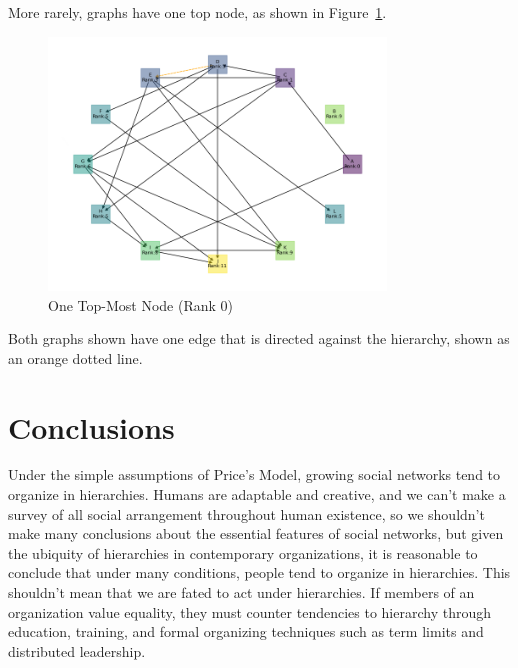 \documentclass[12pt]{article}
\begin{document}
More rarely, graphs have one top node, as shown in Figure~\ref{fig:one-top-node}.
\begin{figure}[H]
    \centering
    \includegraphics[width=0.8\textwidth]{images/2025-06-01-15:51:36.967731-network.png}
    \caption{One Top-Most Node (Rank 0)}
    \label{fig:one-top-node}
\end{figure}

Both graphs shown have one edge that is directed against the hierarchy, shown as an orange dotted line.

\section{Conclusions}

Under the simple assumptions of Price's Model, growing social networks tend to organize in hierarchies. Humans are
adaptable and creative, and we can't make a survey of all social arrangement throughout human existence,
so we shouldn't make many conclusions about the essential features of social networks, but given the ubiquity of
hierarchies in contemporary organizations, it is reasonable to conclude that under many conditions, people tend to
organize in hierarchies. This shouldn't mean that we are fated to act under hierarchies. If
members of an organization value equality, they must counter tendencies to hierarchy through education, training,
and formal organizing techniques such as term limits and distributed leadership.

\end{document}
